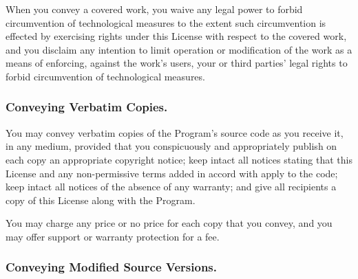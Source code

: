 \documentclass[10pt,english]{article}
\begin{document}
When you convey a covered work, you waive any legal power to forbid
circumvention of technological measures to the extent such circumvention
is effected by exercising rights under this License with respect to
the covered work, and you disclaim any intention to limit operation
or modification of the work as a means of enforcing, against the work's
users, your or third parties' legal rights to forbid circumvention
of technological measures.


\subsubsection{Conveying Verbatim Copies.\label{sub:Conveying-Verbatim-Copies.}}

You may convey verbatim copies of the Program's source code as you
receive it, in any medium, provided that you conspicuously and appropriately
publish on each copy an appropriate copyright notice; keep intact
all notices stating that this License and any non-permissive terms
added in accord with  apply
to the code; keep intact all notices of the absence of any warranty;
and give all recipients a copy of this License along with the Program.

You may charge any price or no price for each copy that you convey,
and you may offer support or warranty protection for a fee.


\subsubsection{Conveying Modified Source Versions.\label{sub:Conveying-Modified-Source}}
\end{document}
